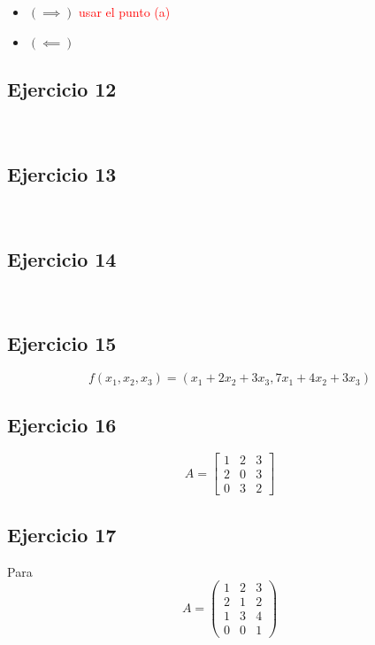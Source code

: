 \documentclass{article}
\begin{document}
\begin{itemize}
    \item[] $(\implies)$ \textcolor{red}{usar el punto (a)}
    \item[] $(\impliedby)$ 
\end{itemize}

\subsection*{Ejercicio 12}

\

\subsection*{Ejercicio 13}

\

\subsection*{Ejercicio 14}

\

\subsection*{Ejercicio 15}

\[f(x_1,x_2,x_3) = (x_1 + 2x_2 + 3x_3, 7x_1 + 4x_2 + 3x_3)\]

\subsection*{Ejercicio 16}

\[A = \begin{bmatrix}
    1 & 2 & 3 \\
    2 & 0 & 3 \\
    0 & 3 & 2
\end{bmatrix}\]

\newpage

\subsection*{Ejercicio 17}

Para \[A = \begin{pmatrix}
    1 & 2 & 3 \\
    2 & 1 & 2 \\
    1 & 3 & 4 \\
    0 & 0 & 1
\end{pmatrix}\]
\end{document}
